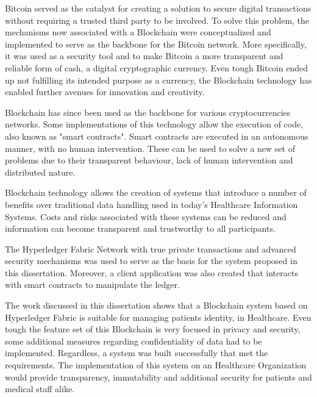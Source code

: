 \begin{tueABSTRACT}

  Bitcoin served as the catalyst for creating a solution to secure digital
  transactions without requiring a trusted third party to be involved. To solve
  this problem, the mechanisms now associated with a Blockchain were
  conceptualized and implemented to serve as the backbone for the Bitcoin
  network. More specifically, it was used as a security tool and to make
  Bitcoin a more transparent and reliable form of cash, a digital cryptographic
  currency. Even tough Bitcoin ended up not fulfilling its intended purpose as
  a currency, the Blockchain technology has enabled further avenues for
  innovation and creativity.

  Blockchain has since been used as the backbone for various cryptocurrencies
  networks. Some implementations of this technology allow the execution of
  code, also known as "smart contracts". Smart contracts are executed in an
  autonomous manner, with no human intervention. These can be used to solve a
  new set of problems due to their transparent behaviour, lack of human
  intervention and distributed nature. 

  Blockchain technology allows the creation of systems that introduce a number
  of benefits over traditional data handling used in today's Healthcare
  Information Systems. Costs and risks associated with these systems can be
  reduced and information can become transparent and trustworthy to all
  participants.
  
  The Hyperledger Fabric Network with true private transactions and advanced
  security mechanisms was used to serve as the basis for the system proposed in
  this dissertation. Moreover, a client application was also created that
  interacts with smart contracts to manipulate the ledger.
  
  The work discussed in this dissertation shows that a Blockchain system based
  on Hyperledger Fabric is suitable for managing patients identity, in
  Healthcare. Even tough the feature set of this Blockchain is very focused in
  privacy and security, some additional measures regarding confidentiality of
  data had to be implemented.  Regardless, a system was built successfully that
  met the requirements. The implementation of this system on an Healthcare
  Organization would provide transparency, immutability and additional security
  for patients and medical staff alike. 

\end{tueABSTRACT}
